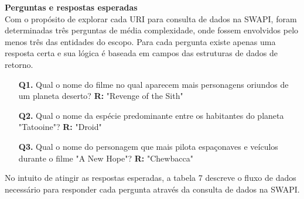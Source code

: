 \textbf{Perguntas e respostas esperadas} \\

Com o propósito de explorar cada URI para consulta de dados na SWAPI, foram determinadas três perguntas de média complexidade, onde fossem envolvidos pelo menos três das entidades do escopo. Para cada pergunta existe apenas uma resposta certa e sua lógica é baseada em campos das estruturas de dados de retorno.

\begin{enumerate}
\item[\textbf{Q1.}] Qual o nome do filme no qual aparecem mais personagens oriundos de um planeta deserto? \textbf{R:} "Revenge of the Sith"
\item[\textbf{Q2.}] Qual o nome da espécie predominante entre os habitantes do planeta "Tatooine"? \textbf{R:} "Droid"
\item[\textbf{Q3.}] Qual o nome do personagem que mais pilota espaçonaves e veículos durante o filme "A New Hope"? \textbf{R:} "Chewbacca"
\end{enumerate}

No intuito de atingir as respostas esperadas, a tabela 7 descreve o fluxo de dados necessário para responder cada pergunta através da consulta de dados na SWAPI.

